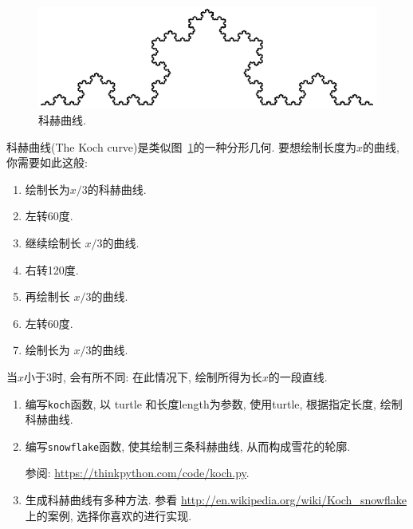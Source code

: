 \documentclass[10pt]{book}
\begin{document}
\begin{figure}
\centerline
{\includegraphics[scale=0.8]{figs/koch.pdf}}
\caption{科赫曲线.}
\label{fig.koch}
\end{figure}

\begin{exercise}

科赫曲线(The Koch curve)是类似图~\ref{fig.koch}的一种分形几何. 
要想绘制长度为$x$的曲线, 你需要如此这般:

\begin{enumerate}

\item 绘制长为$x/3$的科赫曲线. 

\item 左转60度. 

\item 继续绘制长 $x/3$的曲线. 

\item 右转120度. 

\item 再绘制长 $x/3$的曲线. 

\item 左转60度. 

\item 绘制长为 $x/3$的曲线. 

\end{enumerate}

当$x$小于3时, 会有所不同: 在此情况下, 绘制所得为长$x$的一段直线. 

\begin{enumerate}

\item 编写{\tt koch}函数, 以 turtle 和长度length为参数, 使用turtle, 根据指定长度, 绘制
科赫曲线. 

\item 编写{\tt snowflake}函数, 使其绘制三条科赫曲线, 
从而构成雪花的轮廓.

参阅: \url{https://thinkpython.com/code/koch.py}.

\item 生成科赫曲线有多种方法. 参看
\url{http://en.wikipedia.org/wiki/Koch_snowflake} 上的案例, 选择你喜欢的进行实现. 


\end{enumerate}
\end{exercise}
\end{document}
